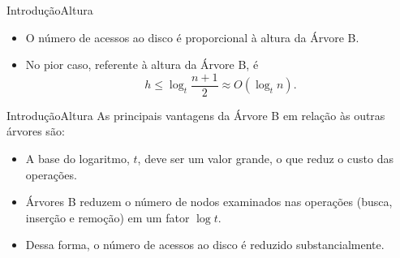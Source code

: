 \documentclass[aspectratio=169]{beamer}
\begin{document}
\begin{frame}{Introdução}{Altura}
\begin{itemize}
\item O número de acessos ao disco é proporcional à altura da Árvore B.
\item No pior caso, referente à altura da Árvore B, é
\begin{equation}
 h \leq \log_t \frac{n+1}{2} \approx O(\log_t n).\nonumber
\end{equation}
\end{itemize}
\end{frame}


\begin{frame}{Introdução}{Altura}
 As principais vantagens da Árvore B em relação às outras árvores são:
\begin{itemize}
\item A base do logaritmo, $t$, deve ser um valor grande, o que reduz o custo das operações.
\item Árvores B reduzem o número de nodos examinados nas operações (busca, inserção e remoção) em um fator $\log t$.
\item Dessa forma, o número de acessos ao disco é reduzido substancialmente.
\end{itemize}
\end{frame}
\end{document}
